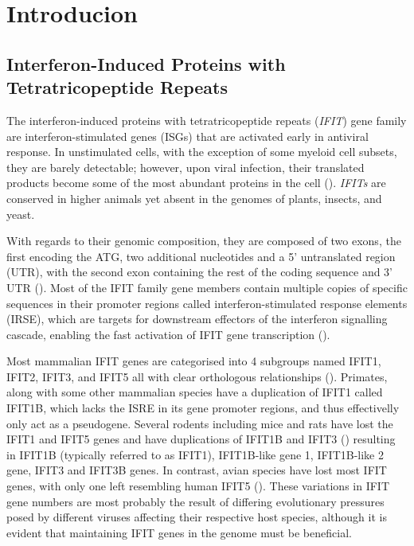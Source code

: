 \chapter{Introducion} \label{ch:Introduction}
\section{Interferon-Induced Proteins with Tetratricopeptide Repeats} \label{sec:Interferon-Induced Proteins with Tetratricopeptide Repeats}
The interferon-induced proteins with tetratricopeptide repeats (\textit{IFIT}) gene family are interferon-stimulated genes (ISGs) that are activated early in antiviral response. In unstimulated cells, with the exception of some myeloid cell subsets, they are barely detectable; however, upon viral infection, their translated products become some of the most abundant proteins in the cell (\cite{Diamond2013TheProteins}). \textit{IFITs} are conserved in higher animals yet absent in the genomes of plants, insects, and yeast. 

With regards to their genomic composition, they are composed of two exons, the first encoding the ATG, two additional nucleotides and a 5' untranslated region (UTR), with the second exon containing the rest of the coding sequence and 3' UTR (\cite{deVeer1998IFI60/ISG60/IFIT4Genes}). Most of the IFIT family gene members contain multiple copies of specific sequences in their promoter regions called interferon-stimulated response elements (IRSE), which are targets for downstream effectors of the interferon signalling cascade, enabling the fast activation of IFIT gene transcription (\cite{Lou2009Ifr-9/stat2Stat1}).   

Most mammalian IFIT genes are categorised into 4 subgroups named IFIT1, IFIT2, IFIT3, and IFIT5 all with clear orthologous relationships (\cite{Sarkar2004NovelGenes}). Primates, along with some other mammalian species have a duplication of IFIT1 called IFIT1B, which lacks the ISRE in its gene promoter regions, and thus effectivelly only act as a pseudogene. Several rodents including mice and rats have lost the IFIT1 and IFIT5 genes and have duplications of IFIT1B and IFIT3 (\cite{Daugherty2016Evolution-guidedMammals.}) resulting in IFIT1B (typically referred to as IFIT1), IFIT1B-like gene 1, IFIT1B-like 2 gene, IFIT3 and IFIT3B genes. In contrast, avian species have lost most IFIT genes, with only one left resembling human IFIT5 (\cite{Liu2013Lineage-SpecificFamily}). These variations in IFIT gene numbers are most probably the result of differing evolutionary pressures posed by different viruses affecting their respective host species, although it is evident that maintaining IFIT genes in the genome must be beneficial. 

